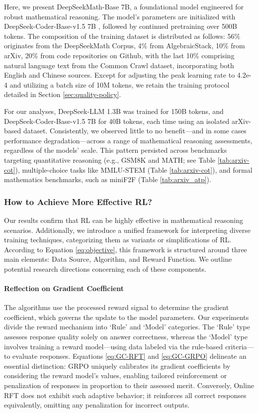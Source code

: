 Here, we present DeepSeekMath-Base 7B, a foundational model engineered for robust mathematical reasoning. The model’s parameters are initialized with DeepSeek-Coder-Base-v1.5 7B \citep{deepseek-coder}, followed by continued pretraining over 500B tokens. The composition of the training dataset is distributed as follows: 56\% originates from the DeepSeekMath Corpus, 4\% from AlgebraicStack, 10\% from arXiv, 20\% from code repositories on Github, with the last 10\% comprising natural language text from the Common Crawl dataset, incorporating both English and Chinese sources. Except for adjusting the peak learning rate to 4.2e-4 and utilizing a batch size of 10M tokens, we retain the training protocol detailed in Section \ref{sec:quality-policy}.

For our analyses, DeepSeek-LLM 1.3B was trained for 150B tokens, and DeepSeek-Coder-Base-v1.5 7B for 40B tokens, each time using an isolated arXiv-based dataset. Consistently, we observed little to no benefit—and in some cases performance degradation—across a range of mathematical reasoning assessments, regardless of the models’ scale. This pattern persisted across benchmarks targeting quantitative reasoning (e.g., GSM8K and MATH; see Table \ref{tab:arxiv-cot}), multiple-choice tasks like MMLU-STEM (Table \ref{tab:arxiv-cot}), and formal mathematics benchmarks, such as miniF2F (Table \ref{tab:arxiv_atp}).

\subsubsection{How to Achieve More Effective RL?}
\label{sec:effec_rl}
Our results confirm that RL can be highly effective in mathematical reasoning scenarios. Additionally, we introduce a unified framework for interpreting diverse training techniques, categorizing them as variants or simplifications of RL. According to Equation \ref{eq:objective}, this framework is structured around three main elements: Data Source, Algorithm, and Reward Function. We outline potential research directions concerning each of these components.

\paragraph{Reflection on Gradient Coefficient} The algorithms use the processed reward signal to determine the gradient coefficient, which governs the update to the model parameters. Our experiments divide the reward mechanism into `Rule' and `Model' categories. The `Rule' type assesses response quality solely on answer correctness, whereas the `Model' type involves training a reward model—using data labeled via the rule-based criteria—to evaluate responses. Equations \ref{eq:GC-RFT} and \ref{eq:GC-GRPO} delineate an essential distinction: GRPO uniquely calibrates its gradient coefficients by considering the reward model’s values, enabling tailored reinforcement or penalization of responses in proportion to their assessed merit. Conversely, Online RFT does not exhibit such adaptive behavior; it reinforces all correct responses equivalently, omitting any penalization for incorrect outputs.

